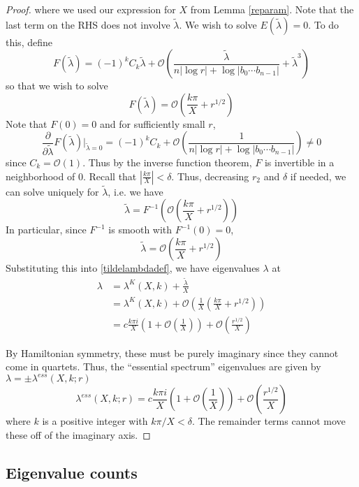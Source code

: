 \documentclass[thesis.tex]{subfiles}
\begin{document}
\begin{lemma}
\begin{proof}
where we used our expression for $X$ from Lemma \ref{reparam}. Note that the last term on the RHS does not involve $\tilde{\lambda}$. We wish to solve $E(\tilde{\lambda}) = 0$. To do this, define
\[
F(\tilde{\lambda}) = (-1)^k C_k \tilde{\lambda} + \mathcal{O}\left( \frac{\tilde{\lambda}}{n|\log r| + \log|b_0\cdots b_{n-1}|} + \tilde{\lambda}^3 \right)
\]
so that we wish to solve
\[
F(\tilde{\lambda}) = \mathcal{O} \left( \frac{k \pi}{X} + r^{1/2} \right)
\]
Note that $F(0) = 0$ and for sufficiently small $r$, 
\[
\frac{\partial}{\partial\tilde{\lambda}}F(\tilde{\lambda})\big|_{\tilde{\lambda} = 0}
= (-1)^k C_k + \mathcal{O}\left( \frac{1}{n|\log r| + \log|b_0\cdots b_{n-1}|} \right) \neq 0
\]
since $C_k = \mathcal{O}(1)$. Thus by the inverse function theorem, $F$ is invertible in a neighborhood of 0. Recall that $|\frac{k \pi}{X}| < \delta$. Thus, decreasing $r_2$ and $\delta$ if needed, we can solve uniquely for $\tilde{\lambda}$, i.e. we have
\[
\tilde{\lambda} = F^{-1}\left( \mathcal{O} \left( \frac{k \pi}{X} + r^{1/2} \right)\right)
\]
In particular, since $F^{-1}$ is smooth with $F^{-1}(0) = 0$,
\[
\tilde{\lambda} = \mathcal{O}\left( \frac{k \pi}{X} + r^{1/2} \right)
\]
Substituting this into \eqref{tildelambdadef}, we have eigenvalues $\lambda$ at
\begin{align*}
\lambda &= \lambda^K(X,k) + \frac{\tilde{\lambda}}{X} \\
&= \lambda^K(X,k) + \mathcal{O}\left( \frac{1}{X} \left( \frac{k \pi}{X} + r^{1/2} \right) \right)\\
&= c \frac{k \pi i }{X} \left( 1 + \mathcal{O}\left( \frac{1}{X} \right)\right) + \mathcal{O}\left( \frac{r^{1/2}}{X} \right)
\end{align*}

By Hamiltonian symmetry, these must be purely imaginary since they cannot come in quartets. Thus, the ``essential spectrum'' eigenvalues are given by $\lambda = \pm \lambda^{ess}(X, k; r)$
\[
\lambda^{ess}(X, k; r) = c \frac{k \pi i }{X} \left( 1 + \mathcal{O}\left( \frac{1}{X} \right)\right) + \mathcal{O}\left( \frac{r^{1/2}}{X} \right)
\]
where $k$ is a positive integer with $k \pi/X < \delta$. The remainder terms cannot move these off of the imaginary axis.
\end{proof}
\end{lemma}

\subsection{Eigenvalue counts}
\end{document}
